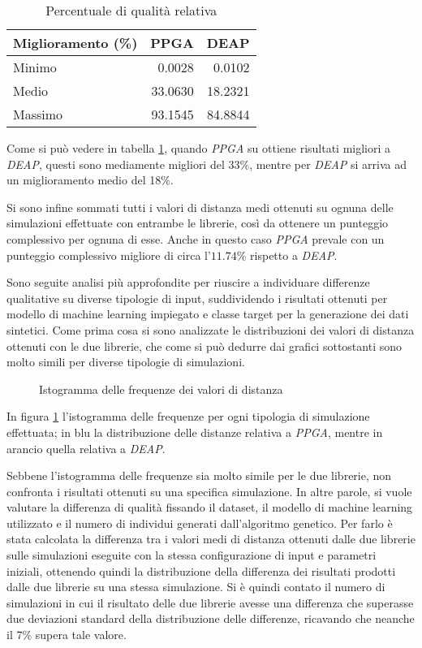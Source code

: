 \begin{table}[H]
	\centering
	\begin{tabular}{lrr}
		\toprule
		Miglioramento (\%) & PPGA    & DEAP    \\
		\midrule
		Minimo             & 0.0028  & 0.0102  \\
		Medio              & 33.0630 & 18.2321 \\
		Massimo            & 93.1545 & 84.8844 \\
		\bottomrule
	\end{tabular}
	\caption{Percentuale di qualità relativa}
	\label{tab: improvement}
\end{table}

Come si può vedere in tabella \ref{tab: improvement}, quando \textit{PPGA} su
ottiene risultati migliori a \textit{DEAP}, questi sono mediamente migliori del
33\%, mentre per \textit{DEAP} si arriva ad un miglioramento medio del 18\%.

Si sono infine sommati tutti i valori di distanza medi ottenuti su ognuna delle
simulazioni effettuate con entrambe le librerie, così da ottenere un punteggio
complessivo per ognuna di esse. Anche in questo caso \textit{PPGA} prevale con
un punteggio complessivo migliore di circa l'$11.74\%$ rispetto a \textit{DEAP}.

Sono seguite analisi più approfondite per riuscire a individuare differenze
qualitative su diverse tipologie di input, suddividendo i risultati ottenuti
per modello di machine learning impiegato e classe target per la generazione
dei dati sintetici. Come prima cosa si sono analizzate le distribuzioni dei
valori di distanza ottenuti con le due librerie, che come si può dedurre dai
grafici sottostanti sono molto simili per diverse tipologie di simulazioni.

\begin{figure}[H]
	
	\caption{Istogramma delle frequenze dei valori di distanza}
	\label{fig: hist_distance}
\end{figure}

In figura \ref{fig: hist_distance} l'istogramma delle frequenze per ogni
tipologia di simulazione effettuata; in blu la distribuzione delle distanze
relativa a \textit{PPGA}, mentre in arancio quella relativa a \textit{DEAP}.

Sebbene l'istogramma delle frequenze sia molto simile per le due librerie, non
confronta i risultati ottenuti su una specifica simulazione. In altre parole,
si vuole valutare la differenza di qualità fissando il dataset, il modello di
machine learning utilizzato e il numero di individui generati dall'algoritmo
genetico. Per farlo è stata calcolata la differenza tra i valori medi di
distanza ottenuti dalle due librerie sulle simulazioni eseguite con la stessa
configurazione di input e parametri iniziali, ottenendo quindi la distribuzione
della differenza dei risultati prodotti dalle due librerie su una stessa
simulazione. Si è quindi contato il numero di simulazioni in cui il risultato
delle due librerie avesse una differenza che superasse due deviazioni standard
della distribuzione delle differenze, ricavando che neanche il 7\% supera tale
valore.

